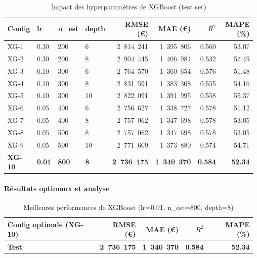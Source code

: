 \documentclass[12pt,a4paper]{article}
\begin{document}
\begin{table}[H]
\centering
\begin{tabular}{@{}llllrrrr@{}}
\toprule
\textbf{Config} & \textbf{lr} & \textbf{n\_est} & \textbf{depth} &
\textbf{RMSE (€)} & \textbf{MAE (€)} & \textbf{$R^2$} & \textbf{MAPE (\%)} \\ \midrule
XG-1  & 0.30 & 200 & 6  & 2~814~241 & 1~395~806 & 0.560 & 53.07 \\
XG-2  & 0.30 & 200 & 8  & 2~904~445 & 1~406~981 & 0.532 & 57.49 \\
XG-3  & 0.10 & 300 & 6  & 2~764~570 & 1~360~654 & 0.576 & 51.48 \\
XG-4  & 0.10 & 300 & 8  & 2~831~591 & 1~383~308 & 0.555 & 54.16 \\
XG-5  & 0.10 & 300 & 10 & 2~822~091 & 1~391~995 & 0.558 & 55.37 \\
XG-6  & 0.05 & 400 & 6  & 2~756~627 & 1~338~727 & 0.578 & 51.12 \\
XG-7  & 0.05 & 400 & 8  & 2~757~062 & 1~347~698 & 0.578 & 53.05 \\
XG-8  & 0.05 & 500 & 8  & 2~757~062 & 1~347~698 & 0.578 & 53.05 \\
XG-9  & 0.05 & 500 & 10 & 2~771~609 & 1~373~880 & 0.574 & 54.71 \\
\textbf{XG-10} & \textbf{0.01} & \textbf{800} & \textbf{8} &
\textbf{2~736~175} & \textbf{1~340~370} & \textbf{0.584} & \textbf{52.34} \\ \midrule
\end{tabular}
\caption{Impact des hyperparamètres de XGBoost (test set)}
\end{table}

\paragraph{Résultats optimaux et analyse}

\begin{table}[H]
\centering
\begin{tabular}{@{}lrrrr@{}}
\toprule
\textbf{Config optimale (XG-10)} & \textbf{RMSE (€)} & \textbf{MAE (€)} & \textbf{$R^2$} & \textbf{MAPE (\%)} \\ \midrule
\textbf{Test} & \textbf{2~736~175} & \textbf{1~340~370} & \textbf{0.584} & \textbf{52.34} \\ \bottomrule
\end{tabular}
\caption{Meilleures performances de XGBoost (lr=0.01, n\_est=800, depth=8)}
\end{table}
\end{document}
